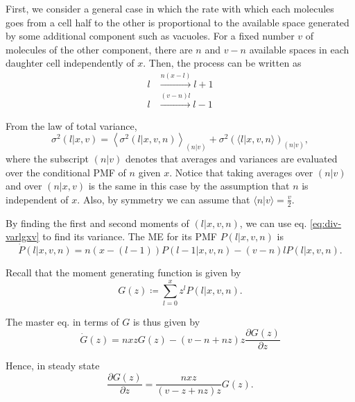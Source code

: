 First, we consider a general case in which the rate with which each molecules goes from a cell half to the other is proportional to the available space generated by some additional component such as vacuoles. For a fixed number $v$ of molecules of the other component, there are $n$ and $v-n$ available spaces in each daughter cell independently of $x$. Then, the process can be written as
\begin{equation}
  \label{eq:div-arr_disg}
  \begin{split}
    l&\xrightarrow{n(x-l)}l+1\\
    l&\xrightarrow{(v-n)l}l-1
  \end{split}
\end{equation}

From the law of total variance,
\begin{equation}
  \label{eq:div-varlgxv}
  \sigma^2(l|x,v) = \left\langle\sigma^2(l|x,v,n)\right\rangle_{(n|v)}+\sigma^2\left(\langle l|x,v,n\rangle\right)_{(n|v)},
\end{equation}
where the subscript $(n|v)$ denotes that averages and variances are evaluated over the conditional PMF of $n$ given $x$. Notice that taking averages over $(n|v)$ and over $(n|x,v)$ is the same in this case by the assumption that $n$ is independent of $x$. Also, by symmetry we can assume that $\langle n|v\rangle = \frac{v}{2}$.

By finding the first and second moments of $(l|x,v,n)$, we can use eq. \eqref{eq:div-varlgxv} to find its variance. The ME for its PMF $P(l|x,v,n)$ is
\begin{equation*}
  \dot{P}(l|x,v,n) = n(x-(l-1))P(l-1|x,v,n) - (v-n)lP(l|x,v,n).
\end{equation*}

Recall that the moment generating function is given by
\begin{equation}
  \label{eq:div-Gdef}
  G(z) \coloneqq \sum_{l=0}^xz^lP(l|x,v,n).
\end{equation}

The master eq. in terms of $G$ is thus given by
\begin{equation*}
  \dot{G}(z) = nxzG(z) - (v-n+nz)z\frac{\partial G(z)}{\partial z}
\end{equation*}

Hence, in steady state
\begin{equation*}
  \frac{\partial G(z)}{\partial z} = \frac{nxz}{(v-z+nz)z}G(z).
\end{equation*}

